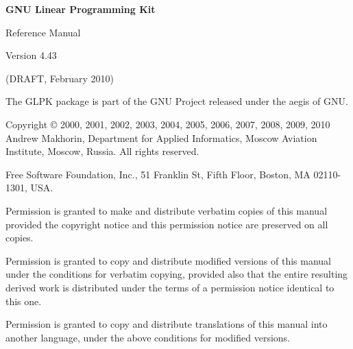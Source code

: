 \documentclass[dvipdfm,11pt]{report}
\begin{document}
\thispagestyle{empty}

\begin{center}

\vspace*{1in}

\begin{huge}
\sf\bfseries GNU Linear Programming Kit
\end{huge}

\vspace{0.5in}

\begin{LARGE}
\sf Reference Manual
\end{LARGE}

\vspace{0.5in}

\begin{LARGE}
\sf Version 4.43
\end{LARGE}

\vspace{0.5in}
\begin{Large}
\sf (DRAFT, February 2010)
\end{Large}
\end{center}

\newpage

\vspace*{1in}

\vfill

\noindent
The GLPK package is part of the GNU Project released under the aegis of
GNU.

\medskip \noindent
Copyright \copyright{} 2000, 2001, 2002, 2003, 2004, 2005, 2006, 2007,
2008, 2009, 2010 Andrew Makhorin, Department for Applied Informatics,
Moscow Aviation Institute, Moscow, Russia. All rights reserved.

\medskip \noindent
Free Software Foundation, Inc., 51 Franklin St, Fifth Floor, Boston, MA
02110-1301, USA.

\medskip \noindent
Permission is granted to make and distribute verbatim copies of this
manual provided the copyright notice and this permission notice are
preserved on all copies.

\medskip \noindent
Permission is granted to copy and distribute modified versions of this
manual under the conditions for verbatim copying, provided also that the
entire resulting derived work is distributed under the terms of
a permission notice identical to this one.

\medskip \noindent
Permission is granted to copy and distribute translations of this manual
into another language, under the above conditions for modified versions.

\tableofcontents













\appendix












\end{document}

